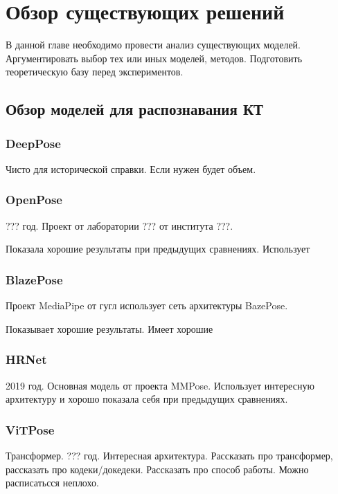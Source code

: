 \section{Обзор существующих решений}
\label{sec:Chapter4} 

В данной главе необходимо провести анализ существующих моделей. Аргументировать выбор тех или иных моделей, методов. Подготовить теоретическую базу перед экспериментов.

\subsection{Обзор моделей для распознавания КТ}
\label{sec:Chapter4_PE}

\subsubsection*{DeepPose}

Чисто для исторической справки. Если нужен будет объем.

\subsubsection*{OpenPose}

??? год. Проект от лаборатории ??? от института ???. 

Показала хорошие результаты при предыдущих сравнениях. Использует

\subsubsection*{BlazePose}

Проект MediaPipe от гугл использует сеть архитектуры BazePose.

Показывает хорошие результаты. Имеет хорошие

\subsubsection*{HRNet}

2019 год. Основная модель от проекта MMPose. Использует интересную архитектуру и хорошо показала себя при предыдущих сравнениях.

\subsubsection*{ViTPose}

Трансформер. ??? год. Интересная архитектура. Рассказать про трансформер, рассказать про кодеки/докедеки. Рассказать про способ работы. Можно расписатьсся неплохо.

